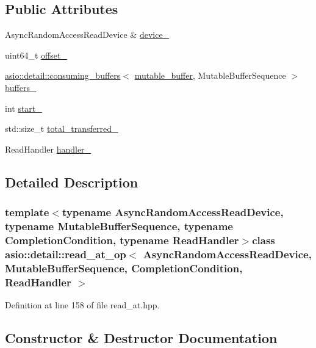 \subsection*{Public Attributes}
\begin{DoxyCompactItemize}
\item 
Async\+Random\+Access\+Read\+Device \& \hyperlink{classasio_1_1detail_1_1read__at__op_a3a786692c55ee5056d74f1ce4ef3e62b}{device\+\_\+}
\item 
uint64\+\_\+t \hyperlink{classasio_1_1detail_1_1read__at__op_aa7b0a3f1f48ffb4563f7616a0ee4d780}{offset\+\_\+}
\item 
\hyperlink{classasio_1_1detail_1_1consuming__buffers}{asio\+::detail\+::consuming\+\_\+buffers}$<$ \hyperlink{classasio_1_1mutable__buffer}{mutable\+\_\+buffer}, Mutable\+Buffer\+Sequence $>$ \hyperlink{classasio_1_1detail_1_1read__at__op_a1cbcc427dad4dff788093e4265eae51d}{buffers\+\_\+}
\item 
int \hyperlink{classasio_1_1detail_1_1read__at__op_ace06581639486fe718eb5e74a6e20653}{start\+\_\+}
\item 
std\+::size\+\_\+t \hyperlink{classasio_1_1detail_1_1read__at__op_ae6d82afb3a9e72a97e7b5054624d08dc}{total\+\_\+transferred\+\_\+}
\item 
Read\+Handler \hyperlink{classasio_1_1detail_1_1read__at__op_af4b1e25bcc5c12dd185e6097587a38b4}{handler\+\_\+}
\end{DoxyCompactItemize}


\subsection{Detailed Description}
\subsubsection*{template$<$typename Async\+Random\+Access\+Read\+Device, typename Mutable\+Buffer\+Sequence, typename Completion\+Condition, typename Read\+Handler$>$class asio\+::detail\+::read\+\_\+at\+\_\+op$<$ Async\+Random\+Access\+Read\+Device, Mutable\+Buffer\+Sequence, Completion\+Condition, Read\+Handler $>$}



Definition at line 158 of file read\+\_\+at.\+hpp.



\subsection{Constructor \& Destructor Documentation}
\hypertarget{classasio_1_1detail_1_1read__at__op_af5cf9ad0aad6944248a1dbaf9d7d2438}{}
